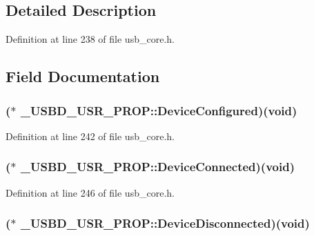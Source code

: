 \subsection{Detailed Description}


Definition at line 238 of file usb\-\_\-core.\-h.



\subsection{Field Documentation}
\hypertarget{struct___u_s_b_d___u_s_r___p_r_o_p_ab80d1e4953acf87ff332878704896f6e}{
\subsubsection[{Device\-Configured}]{($\ast$ \-\_\-\-U\-S\-B\-D\-\_\-\-U\-S\-R\-\_\-\-P\-R\-O\-P\-::\-Device\-Configured)({\bf void})}}\label{struct___u_s_b_d___u_s_r___p_r_o_p_ab80d1e4953acf87ff332878704896f6e}


Definition at line 242 of file usb\-\_\-core.\-h.

\hypertarget{struct___u_s_b_d___u_s_r___p_r_o_p_a985b792fc5106834e2b17d212369ffcd}{
\subsubsection[{Device\-Connected}]{($\ast$ \-\_\-\-U\-S\-B\-D\-\_\-\-U\-S\-R\-\_\-\-P\-R\-O\-P\-::\-Device\-Connected)({\bf void})}}\label{struct___u_s_b_d___u_s_r___p_r_o_p_a985b792fc5106834e2b17d212369ffcd}


Definition at line 246 of file usb\-\_\-core.\-h.

\hypertarget{struct___u_s_b_d___u_s_r___p_r_o_p_afa86ff3cbe54b6f26a61463be2061c49}{
\subsubsection[{Device\-Disconnected}]{($\ast$ \-\_\-\-U\-S\-B\-D\-\_\-\-U\-S\-R\-\_\-\-P\-R\-O\-P\-::\-Device\-Disconnected)({\bf void})}}\label{struct___u_s_b_d___u_s_r___p_r_o_p_afa86ff3cbe54b6f26a61463be2061c49}


